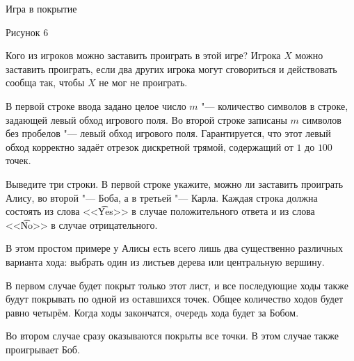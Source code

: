 \begin{problem}{Игра в покрытие}
\begin{center}
Рисунок 6
\end{center}

Кого из игроков можно заставить проиграть в этой игре?
Игрока $X$ можно заставить проиграть, если два других игрока могут
сговориться и действовать сообща так, чтобы $X$ не мог не проиграть.

\InputFile

В первой строке ввода задано целое число $m$ "--- количество символов
в строке, задающей левый обход игрового поля.
Во второй строке записаны $m$ символов без пробелов "--- левый обход
игрового поля.
Гарантируется, что этот левый обход корректно задаёт отрезок дискретной трямой,
содержащий от $1$ до $100$ точек.

\OutputFile

Выведите три строки.
В первой строке укажите, можно ли заставить проиграть Алису,
во второй "--- Боба, а в третьей "--- Карла.
Каждая строка должна состоять из слова <<\t{Yes}>> в случае положительного
ответа и из слова <<\t{No}>> в случае отрицательного.

\Example

\begin{examplethree}
%
\end{examplethree}

\Explanation

В этом простом примере у Алисы есть всего лишь два существенно различных
варианта хода: выбрать один из листьев дерева или центральную вершину.

В первом случае будет покрыт только этот лист, и все последующие ходы
также будут покрывать по одной из оставшихся точек.
Общее количество ходов будет равно четырём.
Когда ходы закончатся, очередь хода будет за Бобом.

Во втором случае сразу оказываются покрыты все точки.
В этом случае также проигрывает Боб.

\end{problem}

